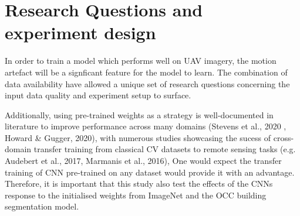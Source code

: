 \documentclass[11pt, a4paper, twoside]{report}
\begin{document}
\begin{table}[H]
  \centering
  \label{table:data_count)}
  \caption{Resulted image and label pair for each dataset input configuration}
\end{table}

\section{Research Questions and experiment design}\label{RQ}

In order to train a model which performs well on UAV imagery, the motion artefact will be a signficant feature for the model to learn. The combination of data availability have allowed a unique set of research questions concerning the input data quality and experiment setup to surface.\\\par

Additionally, using pre-trained weights as a strategy is well-documented in literature to improve performance across many domains (Stevens et al., 2020 , Howard \& Gugger, 2020), with numerous studies showcasing the sucess of cross-domain transfer training from classical CV datasets to remote sensing tasks (e.g. Audebert et al., 2017, Marmanis et al., 2016), One would expect the transfer training of CNN pre-trained on any dataset would provide it with an advantage. Therefore, it is important that this study also test the effects of the CNNs response to the initialised weights from ImageNet and the OCC building segmentation model.\\\par
\end{document}
